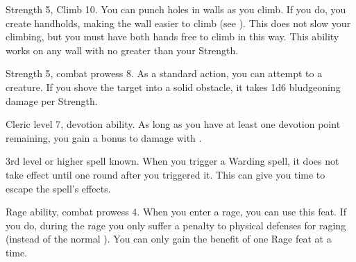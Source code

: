 \featpres Strength 5, Climb 10.
\featben You can punch holes in walls as you climb.
If you do, you create handholds, making the wall easier to climb (see ).
This does not slow your climbing, but you must have both hands free to climb in this way.
This ability works on any wall with  no greater than your Strength.

\featpres Strength 5, combat prowess 8.
\featben As a standard action, you can attempt to  a creature.
If you shove the target into a solid obstacle, it takes 1d6 bludgeoning damage per Strength.

\featpres Cleric level 7, devotion ability.
\featben As long as you have at least one devotion point remaining, you gain a  bonus to damage with .

\featpre 3rd level or higher  spell known.
\featben When you trigger a Warding spell, it does not take effect until one round after you triggered it. This can give you time to escape the spell's effects.

\featpres Rage ability, combat prowess 4.
\featben When you enter a rage, you can use this feat. If you do, during the rage you only suffer a  penalty to physical defenses for raging (instead of the normal ).
 You can only gain the benefit of one Rage feat at a time.

